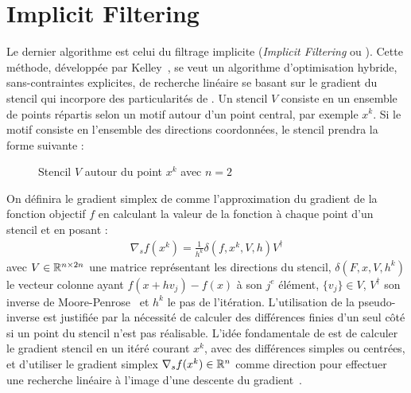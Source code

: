 \section{Implicit Filtering}\label{sec:imf}
Le dernier algorithme est celui du filtrage implicite (\textit{Implicit Filtering} ou \imfil). Cette méthode, développée par Kelley~\cite{Kell99b,Kelley2011}, se veut un algorithme d'optimisation hybride, sans-contraintes explicites, de recherche linéaire se basant sur le gradient du stencil qui incorpore des particularités de \CS. Un stencil $V$ consiste en un ensemble de points répartis selon un motif autour d'un point central, par exemple $x^k$. Si le motif consiste en l'ensemble des directions coordonnées, le stencil prendra la forme suivante : 
 \begin{figure}[H] %
	\begin{center}
	\end{center}
	\caption{Stencil $V$ autour du point $x^k$ avec $n=2$}
	\label{fig:STENCIL}
\end{figure} On définira le gradient simplex de \imfil comme l'approximation du gradient de la fonction objectif $f$ en calculant la valeur de la fonction à chaque point d'un stencil et en posant :
\begin{gather*}
\nabla_{s}f(x^k) = \frac{1}{h^k}\delta(f,x^k,V,h)V^{\dagger}
\end{gather*}
avec $V\in\mathbb{R}^{n \times 2n}$ une matrice représentant les directions du stencil, $\delta(F,x,V,h^k)$ le vecteur colonne ayant $f(x+hv_j) - f(x)$ à son $j^e$ élément, $\{v_j\} \in V$, $V^{\dagger}$ son inverse de Moore-Penrose~\cite{GoVL1996} et $h^k$ le pas de l'itération. L'utilisation de la pseudo-inverse est justifiée par la nécessité de calculer des différences finies d'un seul côté si un point du stencil n'est pas réalisable. L'idée fondamentale de \imfil est de calculer le gradient stencil en un itéré courant $x^k$, avec des différences simples ou centrées, et d'utiliser le gradient simplex $\nabla_{s}f(x^k) \in \mathbb{R}^n$ comme direction pour effectuer une recherche linéaire à l'image d'une descente du gradient~\cite{NoWr2006}.  
  
